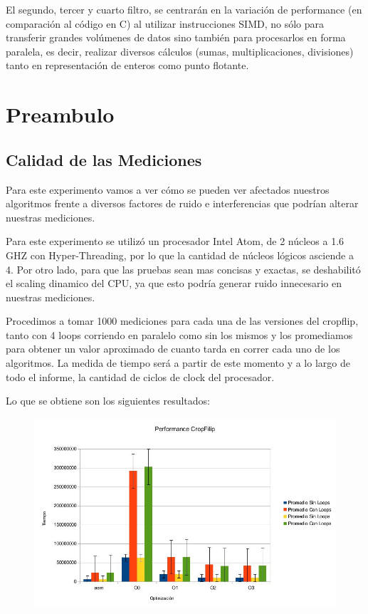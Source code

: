 \documentclass[a4paper]{article}
\begin{document}
El segundo, tercer y cuarto filtro, se centrarán en la variación de performance (en comparación al código en C) al utilizar instrucciones SIMD, no sólo para transferir grandes volúmenes de datos sino también para procesarlos en forma paralela, es decir, realizar diversos cálculos (sumas, multiplicaciones, divisiones) tanto en representación de enteros como punto flotante.

\section{Preambulo}

\subsection{Calidad de las Mediciones}
Para este experimento vamos a ver cómo se pueden ver afectados nuestros algoritmos frente a diversos factores de ruido e interferencias que podrían alterar nuestras mediciones.

Para este experimento se utilizó un procesador Intel Atom, de 2 núcleos a 1.6 GHZ con Hyper-Threading, por lo que la cantidad de núcleos lógicos asciende a 4. Por otro lado, para que las pruebas sean mas concisas y exactas, se deshabilitó el scaling dinamico del CPU, ya que esto podría generar ruido innecesario en nuestras mediciones.

Procedimos a tomar 1000 mediciones para cada una de las versiones del cropflip, tanto con 4 loops corriendo en paralelo como sin los mismos y los promediamos para obtener un valor aproximado de cuanto tarda en correr cada uno de los algoritmos. La medida de tiempo será a partir de este momento y a lo largo de todo el informe, la cantidad de ciclos de clock del procesador. 

Lo que se obtiene son los siguientes resultados:

\newpage
\begin{figure}[h!]
  \begin{center}
  \includegraphics[scale=0.66]{Graficos1.4/1.3/per.jpg}
  \label{nombreparareferenciar1}
  \end{center}
\end{figure}
\end{document}
